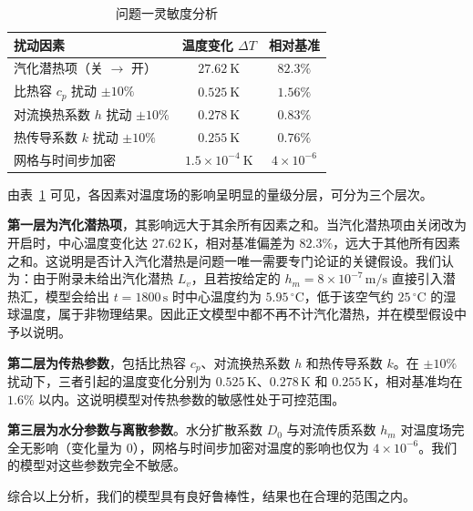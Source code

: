 \documentclass[12pt,a4paper]{article}
\begin{document}
\begin{table}[htbp]
\centering
\caption{问题一灵敏度分析}
\label{tab:sens_q1}
\renewcommand{\arraystretch}{1.15}
\begin{tabular}{lcc}
\toprule
扰动因素 & 温度变化 \(\Delta T\) & 相对基准 \\
\midrule
汽化潜热项（关 \(\to\) 开） & \(27.62\ \mathrm{K}\) & \(82.3\%\) \\
比热容 \(c_p\) 扰动 \(\pm 10\%\) & \(0.525\ \mathrm{K}\) & \(1.56\%\) \\
对流换热系数 \(h\) 扰动 \(\pm 10\%\) & \(0.278\ \mathrm{K}\) & \(0.83\%\) \\
热传导系数 \(k\) 扰动 \(\pm 10\%\) & \(0.255\ \mathrm{K}\) & \(0.76\%\) \\
网格与时间步加密 & \(1.5\times10^{-4}\ \mathrm{K}\) & \(4\times10^{-6}\) \\
\bottomrule
\end{tabular}
\end{table}

由表~\ref{tab:sens_q1} 可见，各因素对温度场的影响呈明显的量级分层，可分为三个层次。

\textbf{第一层为汽化潜热项}，其影响远大于其余所有因素之和。当汽化潜热项由关闭改为开启时，中心温度变化达 \(27.62\,\mathrm{K}\)，相对基准偏差为 \(82.3\%\)，远大于其他所有因素之和。这说明是否计入汽化潜热是问题一唯一需要专门论证的关键假设。我们认为：由于附录未给出汽化潜热 \(L_v\)，且若按给定的 \(h_m=8\times10^{-7}\,\mathrm{m/s}\) 直接引入潜热汇，模型会给出 \(t=1800\,\mathrm{s}\) 时中心温度约为 \(5.95\,^\circ\mathrm{C}\)，低于该空气约 \(25\,^\circ\mathrm{C}\) 的湿球温度，属于非物理结果。因此正文模型中都不再不计汽化潜热，并在模型假设中予以说明。

\textbf{第二层为传热参数}，包括比热容 \(c_p\)、对流换热系数 \(h\) 和热传导系数 \(k\)。在 \(\pm 10\%\) 扰动下，三者引起的温度变化分别为 \(0.525\,\mathrm{K}\)、\(0.278\,\mathrm{K}\) 和 \(0.255\,\mathrm{K}\)，相对基准均在 \(1.6\%\) 以内。这说明模型对传热参数的敏感性处于可控范围。

\textbf{第三层为水分参数与离散参数}。水分扩散系数 \(D_0\) 与对流传质系数 \(h_m\) 对温度场完全无影响（变化量为 0），网格与时间步加密对温度的影响也仅为 \(4\times10^{-6}\)。我们的模型对这些参数完全不敏感。

综合以上分析，我们的模型具有良好鲁棒性，结果也在合理的范围之内。
\end{document}
